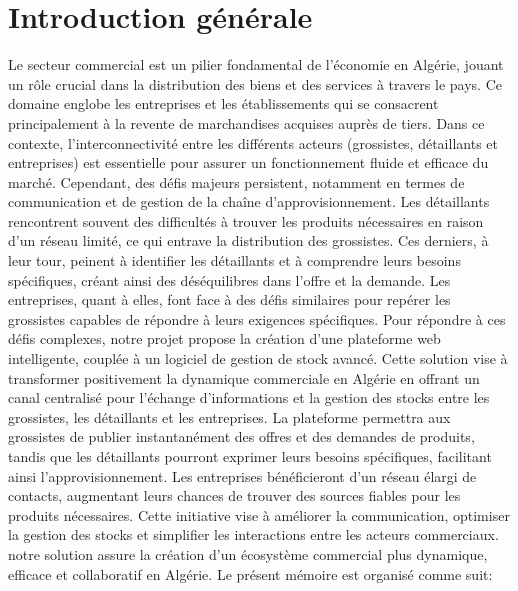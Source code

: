\documentclass[edit,12pt,a4paper,ChapStyle,oneside,doubleinterligne]{report}
\begin{document}
\chapter*{Introduction générale}
Le secteur commercial est un pilier fondamental de l'économie en Algérie, jouant un rôle crucial dans la distribution des biens et des services à travers le pays. Ce domaine englobe les entreprises et les établissements qui se consacrent principalement à la revente de marchandises acquises auprès de tiers. Dans ce contexte, l'interconnectivité entre les différents acteurs (grossistes, détaillants et entreprises) est essentielle pour assurer un fonctionnement fluide et efficace du marché. Cependant, des défis majeurs persistent, notamment en termes de communication et de gestion de la chaîne d'approvisionnement.
\newline \phantom{hassane} \newline
Les détaillants rencontrent souvent des difficultés à trouver les produits nécessaires en raison d'un réseau limité, ce qui entrave la distribution des grossistes. Ces derniers, à leur tour, peinent à identifier les détaillants et à comprendre leurs besoins spécifiques, créant ainsi des déséquilibres dans l'offre et la demande. Les entreprises, quant à elles, font face à des défis similaires pour repérer les grossistes capables de répondre à leurs exigences spécifiques.
\newline \phantom{hassane} \newline
Pour répondre à ces défis complexes, notre projet propose la création d'une plateforme web intelligente, couplée à un logiciel de gestion de stock avancé. Cette solution vise à transformer positivement la dynamique commerciale en Algérie en offrant un canal centralisé pour l'échange d'informations et la gestion des stocks entre les grossistes, les détaillants et les entreprises. La plateforme permettra aux grossistes de publier instantanément des offres et des demandes de produits, tandis que les détaillants pourront exprimer leurs besoins spécifiques, facilitant ainsi l'approvisionnement. Les entreprises bénéficieront d'un réseau élargi de contacts, augmentant leurs chances de trouver des sources fiables pour les produits nécessaires.
\newline \phantom{hassane} \newline
Cette initiative vise à améliorer la communication, optimiser la gestion des stocks et simplifier les interactions entre les acteurs commerciaux. notre solution assure la création d'un écosystème commercial plus dynamique, efficace et collaboratif en Algérie.
\newpage
Le présent mémoire est organisé comme suit:
 \newline
 
\end{document}
